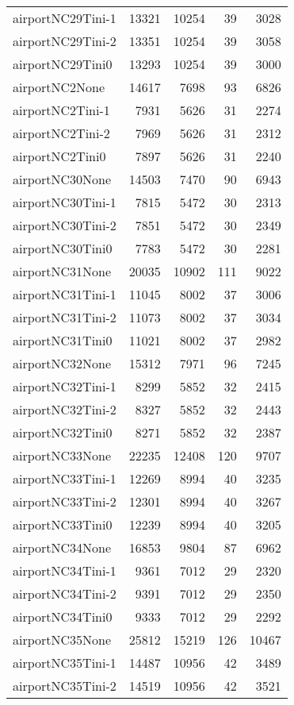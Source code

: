 \begin{longtable}{lrrrr}
airportNC29Tini-1 & 13321 & 10254 & 39 & 3028 \\
airportNC29Tini-2 & 13351 & 10254 & 39 & 3058 \\
airportNC29Tini0 & 13293 & 10254 & 39 & 3000 \\
airportNC2None & 14617 & 7698 & 93 & 6826 \\
airportNC2Tini-1 & 7931 & 5626 & 31 & 2274 \\
airportNC2Tini-2 & 7969 & 5626 & 31 & 2312 \\
airportNC2Tini0 & 7897 & 5626 & 31 & 2240 \\
airportNC30None & 14503 & 7470 & 90 & 6943 \\
airportNC30Tini-1 & 7815 & 5472 & 30 & 2313 \\
airportNC30Tini-2 & 7851 & 5472 & 30 & 2349 \\
airportNC30Tini0 & 7783 & 5472 & 30 & 2281 \\
airportNC31None & 20035 & 10902 & 111 & 9022 \\
airportNC31Tini-1 & 11045 & 8002 & 37 & 3006 \\
airportNC31Tini-2 & 11073 & 8002 & 37 & 3034 \\
airportNC31Tini0 & 11021 & 8002 & 37 & 2982 \\
airportNC32None & 15312 & 7971 & 96 & 7245 \\
airportNC32Tini-1 & 8299 & 5852 & 32 & 2415 \\
airportNC32Tini-2 & 8327 & 5852 & 32 & 2443 \\
airportNC32Tini0 & 8271 & 5852 & 32 & 2387 \\
airportNC33None & 22235 & 12408 & 120 & 9707 \\
airportNC33Tini-1 & 12269 & 8994 & 40 & 3235 \\
airportNC33Tini-2 & 12301 & 8994 & 40 & 3267 \\
airportNC33Tini0 & 12239 & 8994 & 40 & 3205 \\
airportNC34None & 16853 & 9804 & 87 & 6962 \\
airportNC34Tini-1 & 9361 & 7012 & 29 & 2320 \\
airportNC34Tini-2 & 9391 & 7012 & 29 & 2350 \\
airportNC34Tini0 & 9333 & 7012 & 29 & 2292 \\
airportNC35None & 25812 & 15219 & 126 & 10467 \\
airportNC35Tini-1 & 14487 & 10956 & 42 & 3489 \\
airportNC35Tini-2 & 14519 & 10956 & 42 & 3521 \\

\end{longtable}
